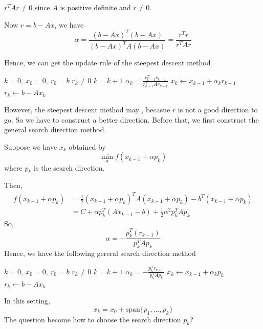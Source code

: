 \begin{note}
    $r^T A r \neq 0$ since $A$ is positive definite and $r \neq 0$.
\end{note}

Now $r = b - Ax$, we have \[
    \alpha = \frac{(b - Ax)^T (b - Ax)}{(b - Ax)^T A (b - Ax)} = \frac{r^T r}{r^T A r}
\]

Hence, we can get the update rule of the steepest descent method 
\begin{codebox}
\li $k = 0,\ x_0 = 0,\ r_0 = b$
\li \While $r_k \neq 0$
\Do
\li $k = k + 1$
\li $\alpha_k = \frac{r^T_{k-1} r_{k-1}}{r^T_{k-1} A r_{k-1}}$
\li $x_k \leftarrow x_{k-1} + \alpha_k r_{k-1}$
\li $r_k \leftarrow b - A x_k$
\End
\end{codebox}

However, the steepest descent method may , becasue $r$ is not a good direction to go. So we have to construct a better direction. Before that, we first construct the general search direction method.

\begin{definition}
    Suppose we have $x_k$ obtained by \[
        \min_{\alpha} f(x_{k-1} + \alpha p_k)
    \]
    where $p_k$ is the search direction.
\end{definition}

Then, \begin{align*}
    f(x_{k-1} + \alpha p_k) &= \frac{1}{2} (x_{k-1} + \alpha p_k)^T A (x_{k-1} + \alpha p_k) - b^T (x_{k-1} + \alpha p_k)\\
    &= C + \alpha p_k^T (A x_{k-1} - b) + \frac{1}{2} \alpha^2 p_k^T A p_k
\end{align*}
So, \[
    \alpha = - \frac{p_k^T (r_{k-1})}{p_k^T A p_k}
\]
Hence, we have the following gereral search direction method
\begin{codebox}
\li $k = 0,\ x_0 = 0,\ r_0 = b$
\li \While $r_k \neq 0$
\Do
\li $k = k + 1$
\li {}
\li $\alpha_k = - \frac{p_k^T r_{k-1}}{p_k^T A p_k}$
\li $x_k \leftarrow x_{k-1} + \alpha_k p_k$
\li $r_k \leftarrow b - A x_k$
\End
\end{codebox}

In this setting, \[
    x_k = x_{0} + \mbox{span}\{p_1, \ldots, p_k \}
\]
The question become how to choose the search direction $p_k$?

\newpage

